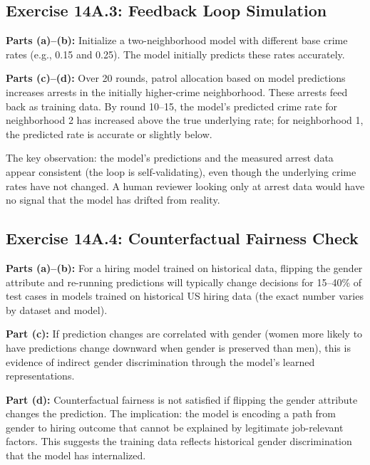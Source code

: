 \subsection*{Exercise 14A.3: Feedback Loop Simulation}

\textbf{Parts (a)--(b):} Initialize a two-neighborhood model with different base crime rates (e.g., 0.15 and 0.25). The model initially predicts these rates accurately.

\textbf{Parts (c)--(d):} Over 20 rounds, patrol allocation based on model predictions increases arrests in the initially higher-crime neighborhood. These arrests feed back as training data. By round 10--15, the model's predicted crime rate for neighborhood 2 has increased above the true underlying rate; for neighborhood 1, the predicted rate is accurate or slightly below.

The key observation: the model's predictions and the measured arrest data appear consistent (the loop is self-validating), even though the underlying crime rates have not changed. A human reviewer looking only at arrest data would have no signal that the model has drifted from reality.

\subsection*{Exercise 14A.4: Counterfactual Fairness Check}

\textbf{Parts (a)--(b):} For a hiring model trained on historical data, flipping the gender attribute and re-running predictions will typically change decisions for 15--40\% of test cases in models trained on historical US hiring data (the exact number varies by dataset and model).

\textbf{Part (c):} If prediction changes are correlated with gender (women more likely to have predictions change downward when gender is preserved than men), this is evidence of indirect gender discrimination through the model's learned representations.

\textbf{Part (d):} Counterfactual fairness is not satisfied if flipping the gender attribute changes the prediction. The implication: the model is encoding a path from gender to hiring outcome that cannot be explained by legitimate job-relevant factors. This suggests the training data reflects historical gender discrimination that the model has internalized.
